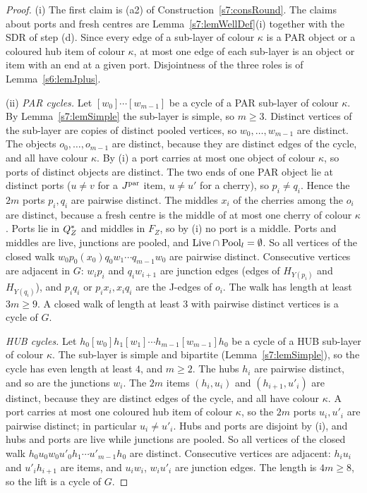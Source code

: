 \begin{proof}
(i) The first claim is (a2) of Construction~\ref{s7:consRound}. The claims about
ports and fresh centres are Lemma~\ref{s7:lemWellDef}(i) together with the SDR
of step (d). Since every edge of a sub-layer of colour $\kappa$ is a PAR object or
a coloured hub item of colour $\kappa$, at most one edge of each sub-layer is an
object or item with an end at a given port. Disjointness of the three roles is  of
Lemma~\ref{s6:lemJplus}.

(ii) \emph{PAR cycles.} Let $[w_0]\cdots[w_{m-1}]$ be a cycle of a PAR sub-layer
of colour $\kappa$. By Lemma~\ref{s7:lemSimple} the sub-layer is simple, so
$m\ge3$. Distinct vertices of the sub-layer are copies of distinct pooled
vertices, so $w_0,\dots,w_{m-1}$ are distinct. The objects $o_0,\dots,o_{m-1}$
are distinct, because they are distinct edges of the cycle, and all have colour
$\kappa$. By (i) a port carries at most one object of colour $\kappa$, so ports
of distinct objects are distinct. The two ends of one PAR object lie at distinct
ports ($u\ne v$ for a $J^{\mathrm{par}}$ item, $u\ne u'$ for a cherry), so $p_i\ne q_i$.
Hence the $2m$ ports $p_i,q_i$ are pairwise distinct. The middles $x_i$ of the
cherries among the $o_i$ are distinct, because a fresh centre is the middle of at
most one cherry of colour $\kappa$. Ports lie in $Q^{*}_Z$ and middles in $F_Z$, so
by (i) no port is a middle. Ports and middles are live, junctions are pooled,
and $\mathrm{Live}\cap\mathrm{Pool}_l=\emptyset$. So all vertices of the closed walk
$w_0p_0(x_0)q_0w_1\cdots q_{m-1}w_0$ are pairwise distinct. Consecutive vertices
are adjacent in $G$: $w_ip_i$ and $q_iw_{i+1}$ are junction edges (edges of
$H_{Y(p_i)}$ and $H_{Y(q_i)}$), and $p_iq_i$ or $p_ix_i,x_iq_i$ are the J-edges
of $o_i$. The walk has length at least $3m\ge9$. A closed walk of length at
least $3$ with pairwise distinct vertices is a cycle of $G$.

\emph{HUB cycles.} Let $h_0[w_0]h_1[w_1]\cdots h_{m-1}[w_{m-1}]h_0$ be a cycle of
a HUB sub-layer of colour $\kappa$. The sub-layer is simple and bipartite
(Lemma~\ref{s7:lemSimple}), so the cycle has even length at least $4$, and
$m\ge2$. The hubs $h_i$ are pairwise distinct, and so are the junctions $w_i$.
The $2m$ items $(h_i,u_i)$ and $(h_{i+1},u'_i)$ are distinct, because they are
distinct edges of the cycle, and all have colour $\kappa$. A port carries at most
one coloured hub item of colour $\kappa$, so the $2m$ ports $u_i,u'_i$ are
pairwise distinct; in particular $u_i\ne u'_i$. Hubs and ports are disjoint by
(i), and hubs and ports are live while junctions are pooled. So all vertices of
the closed walk $h_0u_0w_0u'_0h_1\cdots u'_{m-1}h_0$ are distinct. Consecutive
vertices are adjacent: $h_iu_i$ and $u'_ih_{i+1}$ are items, and $u_iw_i$,
$w_iu'_i$ are junction edges. The length is $4m\ge8$, so the lift is a cycle of
$G$.


\end{proof}
